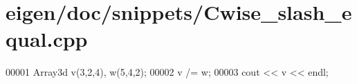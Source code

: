 \hypertarget{eigen_2doc_2snippets_2_cwise__slash__equal_8cpp_source}{}\section{eigen/doc/snippets/\+Cwise\+\_\+slash\+\_\+equal.cpp}
\label{eigen_2doc_2snippets_2_cwise__slash__equal_8cpp_source}

\begin{DoxyCode}
00001 Array3d v(3,2,4), w(5,4,2);
00002 v /= w;
00003 cout << v << endl;
\end{DoxyCode}
